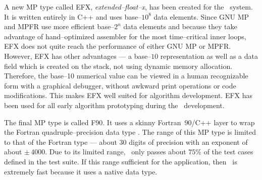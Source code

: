 A new MP type called EFX, {\emph {extended--float--x}}, has been created for
the \efloat\ system. It is written entirely in C++ and uses
base--$10^{8}$ data elements. Since GNU MP and MPFR use more
efficient base--$2^{n}$ data elements and because they take advantage
of hand--optimized assembler for the most time--critical inner loops,
EFX does not quite reach the performance of either GNU MP or MPFR.
However, EFX has other advantages --- a base--$10$ representation as
well as a data field which is created on the stack, not using dynamic
memory allocation. Therefore, the base--10 numerical value can be viewed
in a human recognizable form with a graphical debugger,
without awkward print operations or code modifications.
This makes EFX well suited for algorithm development. EFX has been used
for all early algorithm prototyping during the \efloat\ development.

The final MP type is called F90. It uses a skinny For\-tran~$90$/C++
layer to wrap the Fortran quadruple--precision data type
{}.
The range of this MP type is limited to that of
the Fortran type --- about 30 digits of precision with an exponent
of about $\pm\,4000$. Due to its limited range, \forefloatclass\
only passes about $75$\% of the test cases defined in
the test suite. If this range sufficient
for the application, then \forefloatclass\ is extremely fast
because it uses a native data type.


